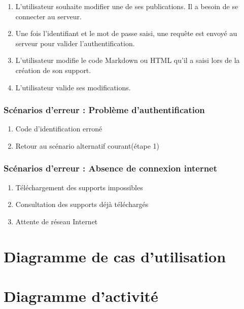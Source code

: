     \begin{enumerate}
        
        \item L'utilisateur souhaite modifier une de ses publications. Il a besoin de se connecter au serveur.
        \item Une fois l'identifiant et le mot de passe saisi, une requête est envoyé au serveur pour valider l'authentification.
        \item L'utilisateur modifie le code Markdown ou HTML qu'il a saisi lors de la création de son support.
        \item L'utilisateur valide ses modifications.
\end{enumerate}

\subsubsection{Scénarios d'erreur : Problème d'authentification}

    \begin{enumerate}
        \item Code d'identification erroné
        \item Retour au scénario alternatif courant(étape 1)
\end{enumerate}

\subsubsection{Scénarios d'erreur : Absence de connexion internet}

    \begin{enumerate}
        \item Téléchargement des supports impossibles
        \item Consultation des supports déjà téléchargés 
        \item Attente de réseau Internet
\end{enumerate}

\newpage

\section{Diagramme de cas d'utilisation}



\section{Diagramme d'activité}

